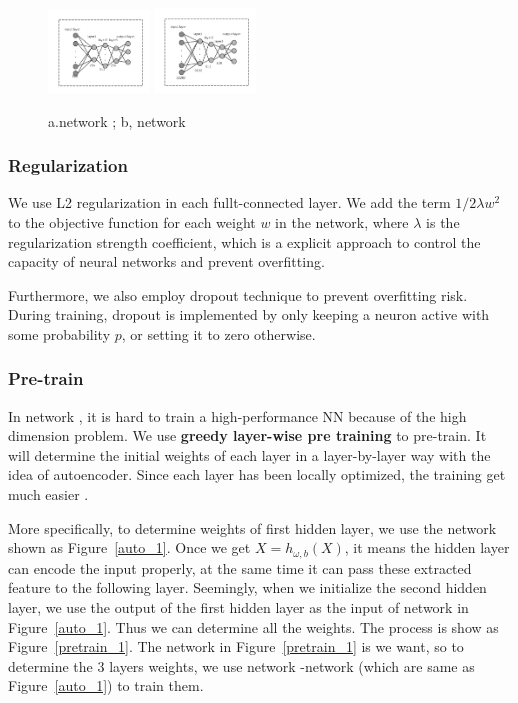 \documentclass[sigconf]{acmart}
\begin{document}
\begin{figure}[!ht]
	\centering
	\includegraphics[width=0.24\textwidth]{../figs/nn_pca.pdf}
	\includegraphics[width=0.24\textwidth]{../figs/nn_raw.pdf}
	\caption{a.network ;  b, network }
	\label{nn_1}
	\centering
\end{figure}

\subsubsection{Regularization}
We use L2 regularization in each fullt-connected layer. We add the term $1/2\lambda w^2$ to the objective function for each weight $w$ in the network, where $\lambda$ is the regularization strength coefficient, which is a explicit approach to control the capacity of neural networks and prevent overfitting.
 
Furthermore, we also employ dropout technique \cite{Dropout} to prevent overfitting risk. During training, dropout is implemented by only keeping a neuron active with some probability $p$, or setting it to zero otherwise.

\subsubsection{Pre-train}
In network , it is hard to train a high-performance NN because of the high dimension problem. We use \textbf{greedy layer-wise pre training} to pre-train. It will determine the initial weights of each layer in a layer-by-layer way with the idea of autoencoder. Since each layer has been locally optimized, the training get much easier .

More specifically, to determine weights of first hidden layer, we use the network shown as Figure~\ref{auto_1}. Once we get $X=h_{\omega,b}(X)$, it means the hidden layer can encode the input properly, at the same time it can pass these extracted feature to the following layer. Seemingly, when we initialize the second hidden layer, we use the output of the first hidden layer as the input of network in Figure~\ref{auto_1}. Thus we can determine all the weights. The process is show as Figure~\ref{pretrain_1}. The network   in  Figure~\ref{pretrain_1} is we want, so to determine the 3 layers weights, we use network -network  (which are same as  Figure~\ref{auto_1}) to train them.
\end{document}
